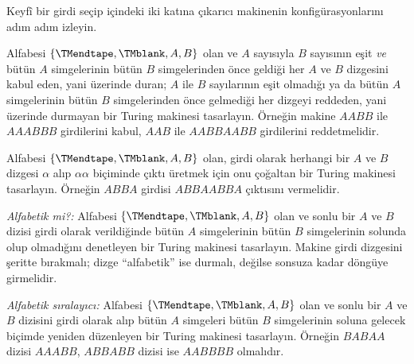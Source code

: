 \documentclass[../../../include/open-logic-section]{subfiles}
\begin{document}
\begin{prob}
Keyfî bir girdi seçip  içindeki iki katına
çıkarıcı makinenin konfigürasyonlarını adım adım izleyin.
\end{prob}

\begin{prob}
Alfabesi $\{\TMendtape,\TMblank,A,B\}$ olan ve $A$ sayısıyla $B$ sayısının
eşit \emph{ve} bütün $A$ simgelerinin bütün $B$ simgelerinden önce geldiği
her $A$ ve $B$ dizgesini kabul eden, yani üzerinde duran; $A$ ile $B$
sayılarının eşit olmadığı ya da bütün $A$ simgelerinin bütün $B$
simgelerinden önce gelmediği her dizgeyi reddeden, yani üzerinde durmayan bir
Turing makinesi tasarlayın. Örneğin makine $AABB$ ile $AAABBB$ girdilerini
kabul, $AAB$ ile $AABBAABB$ girdilerini reddetmelidir.
\end{prob}

\begin{prob}
Alfabesi $\{\TMendtape,\TMblank,A,B\}$ olan, girdi olarak herhangi bir
$A$ ve $B$ dizgesi $\alpha$ alıp $\alpha\alpha$ biçiminde çıktı üretmek için
onu çoğaltan bir Turing makinesi tasarlayın. Örneğin $ABBA$ girdisi
$ABBAABBA$ çıktısını vermelidir.
\end{prob}

\begin{prob}
\emph{Alfabetik mi?:} Alfabesi $\{\TMendtape,\TMblank,A,B\}$ olan ve sonlu
bir $A$ ve $B$ dizisi girdi olarak verildiğinde bütün $A$ simgelerinin bütün
$B$ simgelerinin solunda olup olmadığını denetleyen bir Turing makinesi
tasarlayın. Makine girdi dizgesini şeritte bırakmalı; dizge ``alfabetik'' ise
durmalı, değilse sonsuza kadar döngüye girmelidir.
\end{prob}

\begin{prob}
\emph{Alfabetik sıralayıcı:} Alfabesi
$\{\TMendtape,\TMblank,A,B\}$ olan ve sonlu bir $A$ ve $B$ dizisini girdi
olarak alıp bütün $A$ simgeleri bütün $B$ simgelerinin soluna gelecek biçimde
yeniden düzenleyen bir Turing makinesi tasarlayın. Örneğin $BABAA$ dizisi
$AAABB$, $ABBABB$ dizisi ise $AABBBB$ olmalıdır.
\end{prob}
\end{document}

